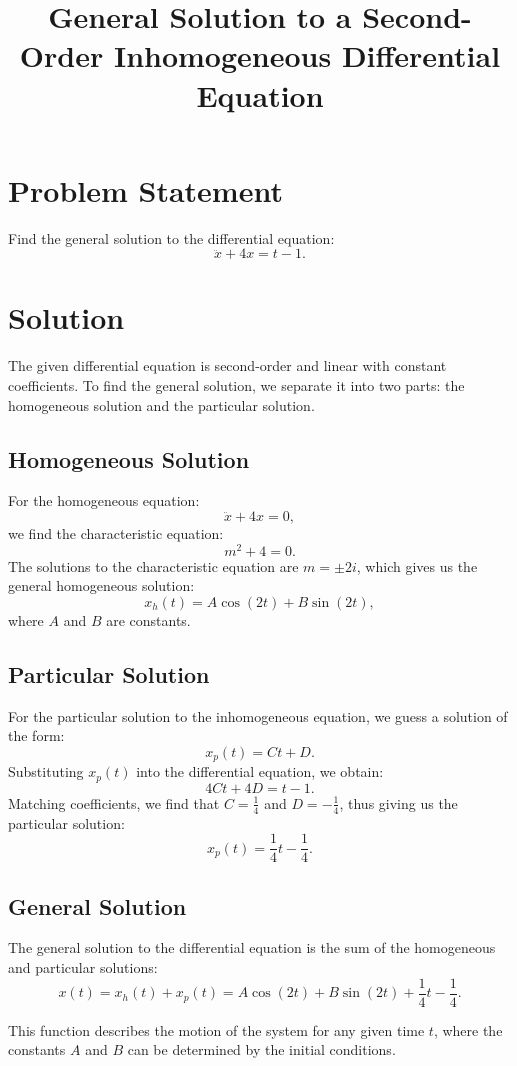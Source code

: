 \documentclass{article}
\begin{document}
\title{General Solution to a Second-Order Inhomogeneous Differential Equation}
\date{}
\maketitle

\section*{Problem Statement}
Find the general solution to the differential equation:
\[ \ddot{x} + 4x = t - 1. \]

\section*{Solution}
The given differential equation is second-order and linear with constant coefficients. To find the general solution, we separate it into two parts: the homogeneous solution and the particular solution.

\subsection*{Homogeneous Solution}
For the homogeneous equation:
\[ \ddot{x} + 4x = 0, \]
we find the characteristic equation:
\[ m^2 + 4 = 0. \]
The solutions to the characteristic equation are \( m = \pm 2i \), which gives us the general homogeneous solution:
\[ x_h(t) = A\cos(2t) + B\sin(2t), \]
where \( A \) and \( B \) are constants.

\subsection*{Particular Solution}
For the particular solution to the inhomogeneous equation, we guess a solution of the form:
\[ x_p(t) = Ct + D. \]
Substituting \( x_p(t) \) into the differential equation, we obtain:
\[ 4Ct + 4D = t - 1. \]
Matching coefficients, we find that \( C = \frac{1}{4} \) and \( D = -\frac{1}{4} \), thus giving us the particular solution:
\[ x_p(t) = \frac{1}{4}t - \frac{1}{4}. \]

\subsection*{General Solution}
The general solution to the differential equation is the sum of the homogeneous and particular solutions:
\[ x(t) = x_h(t) + x_p(t) = A\cos(2t) + B\sin(2t) + \frac{1}{4}t - \frac{1}{4}. \]

This function describes the motion of the system for any given time \( t \), where the constants \( A \) and \( B \) can be determined by the initial conditions.
\end{document}
